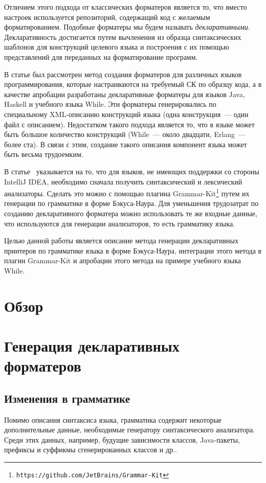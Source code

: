 \documentclass[conference]{IEEEtran}
\begin{document}
Отличием этого подхода от классических форматеров является то, что вместо настроек используется репозиторий, содержащий код с желаемым форматированием.
Подобные форматеры мы будем называть \emph{декларативными}.
Декларативность достигается путем вычленения из образца синтаксических шаблонов для конструкций целевого языка и построения с их помощью представлений для переданных на форматирование программ.

В статье был рассмотрен метод создания форматеров для различных языков программирования, которые настраиваются на требуемый СК по образцу кода, а в качестве апробации разработаны декларативные форматеры для языков Java, Haskell и учебного языка While.
Эти форматеры генерировались по специальному XML-описанию конструкций языка (одна конструкция~--- один файл с описанием). 
Недостатком такого подхода является то, что в языке может быть большое количество конструкций (While~--- около двадцати, Erlang~--- более ста).
В связи с этим, создание такого описания компонент языка может быть весьма трудоемким.

В статье~\cite{while} указывается на то, что для языков, не имеющих поддержки со стороны IntelliJ IDEA, необходимо сначала получить синтаксический и лексический анализаторы.
Сделать это можно с помощью плагина Grammar-Kit\footnote{\texttt{https://github.com/JetBrains/Grammar-Kit}} путем их генерации по грамматике в форме Бэкуса-Наура.
Для уменьшения трудозатрат по созданию декларативного форматера можно использовать те же входные данные, что используются для генерации анализаторов, то есть грамматику языка.

Целью данной работы является описание метода генерации декларативных принтеров по грамматике языка в форме Бэкуса-Наура, интеграции этого метода в плагин Grammar-Kit и апробации этого метода на примере учебного языка While.


\section{Обзор}


\section{Генерация декларативных форматеров}
\subsection{Изменения в грамматике}
Помимо описания синтаксиса языка, грамматика содержит некоторые дополнительные данные, необходимые генератору синтаксического анализатора.
Среди этих данных, например, будущие зависимости классов, Java-пакеты, префиксы и суффикмы сгенерированных классов и др..
\end{document}
